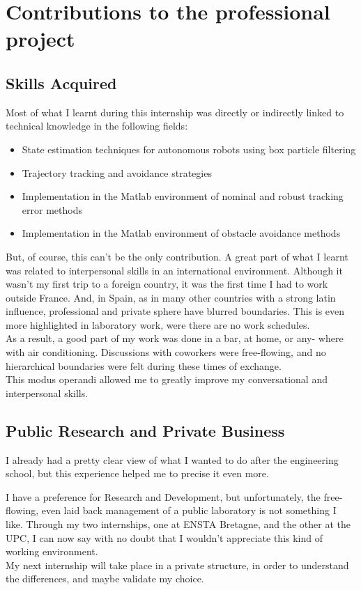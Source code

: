 \chapter{Contributions to the professional project}

\label{apport}


\section{Skills Acquired}
Most of what I learnt during this internship was directly or indirectly linked to technical knowledge in the following fields:

\begin{itemize}
  \item State estimation techniques for autonomous robots using box particle filtering
  \item Trajectory tracking and avoidance strategies
  \item Implementation in the Matlab environment of nominal and robust tracking error methods
  \item Implementation in the Matlab environment of obstacle avoidance methods
\end{itemize}

But, of course, this can’t be the only contribution.
 A great part of what I learnt was related to interpersonal skills in an international environment.
   Although it wasn’t my first trip to a foreign country, it was the first time I had to work outside France.
   And, in Spain, as in many other countries with a strong latin influence, professional and private sphere have blurred boundaries.
This is even more highlighted in laboratory work, were there are no work schedules.\\

As a result, a good part of my work was done in a bar, at home, or any- where with air conditioning.
Discussions with coworkers were free-flowing, and no hierarchical boundaries were felt during these times of exchange.\\

This modus operandi allowed me to greatly improve my conversational and interpersonal skills.

\section{Public Research and Private Business}

I already had a pretty clear view of what I wanted to do after the engineering school, but this experience helped me to precise it even more.

I have a preference for Research and Development, but unfortunately, the free-flowing, even laid back management of a public laboratory is not something I like.
Through my two internships, one at ENSTA Bretagne, and the other at the UPC, I can now say with no doubt that I wouldn't appreciate this kind of working environment.\\

My next internship will take place in a private structure, in order to understand the differences, and maybe validate my choice.

